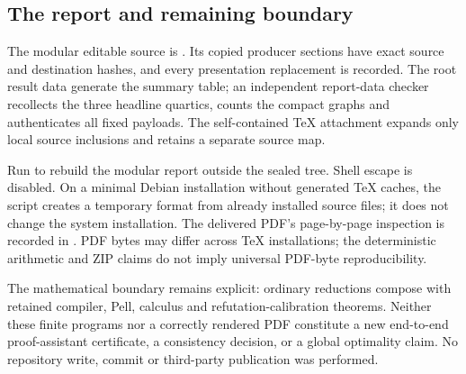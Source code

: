 \documentclass[11pt]{article}
\begin{document}
\subsection{The report and remaining boundary}
The modular editable source is . Its copied
producer sections have exact source and destination hashes, and every
presentation replacement is recorded. The root result data generate the
summary table; an independent report-data checker recollects the three
headline quartics, counts the compact graphs and authenticates all fixed
payloads. The self-contained TeX attachment expands only local source
inclusions and retains a separate source map.

Run  to rebuild the modular report outside the
sealed tree. Shell escape is disabled. On a minimal Debian installation
without generated TeX caches, the script creates a temporary format from
already installed source files; it does not change the system installation.
The delivered PDF's page-by-page inspection is recorded in
. PDF bytes may differ across TeX installations;
the deterministic arithmetic and ZIP claims do not imply universal PDF-byte
reproducibility.

The mathematical boundary remains explicit: ordinary reductions compose with
retained compiler, Pell, calculus and refutation-calibration theorems.
Neither these finite programs nor a correctly rendered PDF constitute a new
end-to-end proof-assistant certificate, a consistency decision, or a global
optimality claim. No repository write, commit or third-party publication was
performed.
\end{document}
